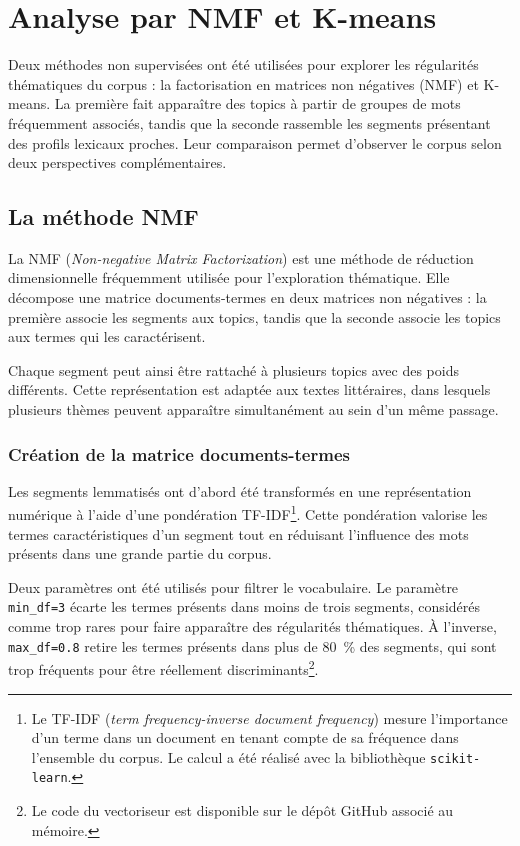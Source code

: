 \section{Analyse par NMF et K-means}

Deux méthodes non supervisées ont été utilisées pour explorer les régularités thématiques du corpus : la factorisation en matrices non négatives (NMF) et K-means. La première fait apparaître des topics à partir de groupes de mots fréquemment associés, tandis que la seconde rassemble les segments présentant des profils lexicaux proches. Leur comparaison permet d'observer le corpus selon deux perspectives complémentaires.

\subsection{La méthode NMF}

La NMF (\textit{Non-negative Matrix Factorization}) est une méthode de réduction dimensionnelle fréquemment utilisée pour l'exploration thématique. Elle décompose une matrice documents-termes en deux matrices non négatives : la première associe les segments aux topics, tandis que la seconde associe les topics aux termes qui les caractérisent.

Chaque segment peut ainsi être rattaché à plusieurs topics avec des poids différents. Cette représentation est adaptée aux textes littéraires, dans lesquels plusieurs thèmes peuvent apparaître simultanément au sein d'un même passage.

\subsubsection{Création de la matrice documents-termes}

Les segments lemmatisés ont d'abord été transformés en une représentation numérique à l'aide d'une pondération TF-IDF\footnote{Le TF-IDF (\textit{term frequency-inverse document frequency}) mesure l'importance d'un terme dans un document en tenant compte de sa fréquence dans l'ensemble du corpus. Le calcul a été réalisé avec la bibliothèque \texttt{scikit-learn}.}. Cette pondération valorise les termes caractéristiques d'un segment tout en réduisant l'influence des mots présents dans une grande partie du corpus.

Deux paramètres ont été utilisés pour filtrer le vocabulaire. Le paramètre \texttt{min\_df=3} écarte les termes présents dans moins de trois segments, considérés comme trop rares pour faire apparaître des régularités thématiques. À l'inverse, \texttt{max\_df=0.8} retire les termes présents dans plus de 80~\% des segments, qui sont trop fréquents pour être réellement discriminants\footnote{Le code du vectoriseur est disponible sur le dépôt GitHub associé au mémoire.}.

